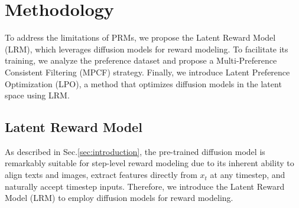 \section{Methodology}
\label{sec:method}

To address the limitations of PRMs, we propose the Latent Reward Model (LRM), which leverages diffusion models for reward modeling. To facilitate its training, we analyze the preference dataset and propose a Multi-Preference Consistent Filtering (MPCF) strategy. Finally, we introduce Latent Preference Optimization (LPO), a method that optimizes diffusion models in the latent space using LRM.

\subsection{Latent Reward Model}
\label{sec:lrm}
As described in Sec.\;\ref{sec:introduction}, the pre-trained diffusion model is remarkably suitable for step-level reward modeling due to its inherent ability to align texts and images, extract features directly from $x_t$ at any timestep, and naturally accept timestep inputs. Therefore, we introduce the Latent Reward Model (LRM) to employ diffusion models for reward modeling.


